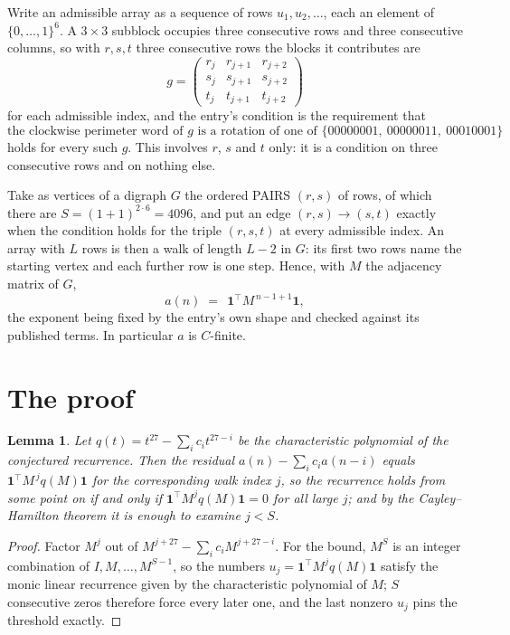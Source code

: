 \documentclass[11pt,a4paper]{article}
\theoremstyle{plain}
\newtheorem{lemma}[theorem]{Lemma}
\theoremstyle{definition}
\begin{document}
Write an admissible array as a sequence of rows $u_1,u_2,\dots$, each an element of
$\{0,\dots,1\}^{6}$. A $3\times3$ subblock occupies three consecutive rows and
three consecutive columns, so with $r,s,t$ three consecutive rows the blocks it
contributes are
\[
g=\begin{pmatrix}r_j&r_{j+1}&r_{j+2}\\ s_j&s_{j+1}&s_{j+2}\\ t_j&t_{j+1}&t_{j+2}\end{pmatrix}
\]
for each admissible index, and the entry's condition is the requirement that
\[
\text{the clockwise perimeter word of }g\text{ is a rotation of one of }\{00000001,\ 00000011,\ 00010001\}
\]
holds for every such $g$. This involves $r$, $s$ and $t$ only: it is a condition on
three consecutive rows and on nothing else.

Take as vertices of a digraph $G$ the ordered PAIRS $(r,s)$ of rows, of which there are
$S=(1+1)^{2\cdot6}=4096$, and put an edge $(r,s)\to(s,t)$ exactly when the condition
holds for the triple $(r,s,t)$ at every admissible index. An array with $L$ rows is then a
walk of length $L-2$ in $G$: its first two rows name the starting vertex and each further
row is one step. Hence, with $M$ the adjacency matrix of $G$,
\[
a(n)\;=\;\,\mathbf{1}^{\!\top}M^{\,n-1+1}\mathbf{1},
\]
the exponent being fixed by the entry's own shape and checked against its published terms.
In particular $a$ is $C$-finite.

\section{The proof}

\begin{lemma}\label{lem:crit}
Let $q(t)=t^{27}-\sum_i c_it^{27-i}$ be the characteristic polynomial of the
conjectured recurrence. Then the residual $a(n)-\sum_ic_ia(n-i)$ equals
$\mathbf{1}^{\!\top}M^{\,j}q(M)\mathbf{1}$ for the corresponding walk index
$j$, so the recurrence holds from some point on if and only if
$\mathbf{1}^{\!\top}M^{j}q(M)\mathbf{1}=0$ for all large $j$; and by the
Cayley--Hamilton theorem it is enough to examine $j<S$.
\end{lemma}

\begin{proof}
Factor $M^{j}$ out of $M^{j+27}-\sum_ic_iM^{j+27-i}$. For the bound, $M^{S}$
is an integer combination of $I,M,\dots,M^{S-1}$, so the numbers
$u_j=\mathbf{1}^{\!\top}M^{j}q(M)\mathbf{1}$ satisfy the monic linear recurrence given by
the characteristic polynomial of $M$; $S$ consecutive zeros therefore force every later one,
and the last nonzero $u_j$ pins the threshold exactly.
\end{proof}
\end{document}
